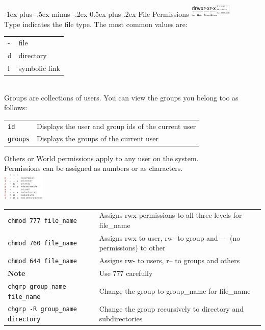 \documentclass[10pt,landscape]{article}
\makeatletter
\renewcommand{\section}{\@startsection{section}{1}{0mm}%
                                {-1ex plus -.5ex minus -.2ex}%
                                {0.5ex plus .2ex}%
                                {\normalfont\large\bfseries}}
\makeatother
\begin{document}
\begin{multicols}{2}
\section{File Permissions}
\includegraphics[width=0.15\textwidth]{./images/perm1.png} \\
Type indicates the file type. The most common values are: \\ 
\begin{tabular}{@{}ll@{}}
 - & file \\
 d & directory \\
 l & symbolic link
\end{tabular}
\\
Groups are collections of users. You can view the groups you belong too as follows: \\
\begin{tabular}{@{}ll@{}}
 \texttt{id} & Displays the user and group ids of the current user \\
 \texttt{groups} & Displays the groups of the current user
\end{tabular}
Others or World permissions apply to any user on the system. \\
Permissions can be assigned as numbers or as characters. \\
\includegraphics[width=0.15\textwidth]{./images/perm2_orig.png} \\
\begin{tabular}{@{}ll@{}}
\texttt{chmod 777 file\_name} & Assigns rwx permissions to all three levels for file\_name  \\
\texttt{chmod 760 file\_name} & Assigns rwx to user, rw- to group and --- (no permissions) to other \\
\texttt{chmod 644 file\_name} & Assigns rw- to users, r-- to groups and others \\
\textbf{Note} & Use 777 carefully \\
\texttt{chgrp group\_name file\_name} & Change the group to group\_name for file\_name \\
\texttt{chgrp -R group\_name directory} & Change the group recursively to directory and subdirectories 
\end{tabular}


\end{multicols}
\end{document}
